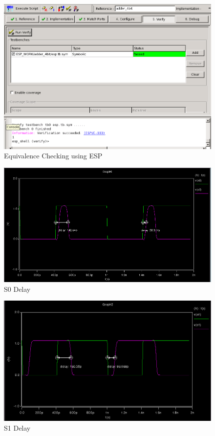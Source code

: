 \documentclass[12pt]{article}
\begin{document}
\begin{figure}[H]
\centering
\includegraphics[width=0.7\linewidth]{esp}
\caption{Equivalence Checking using ESP}
\label{fig:esp}
\end{figure}

\begin{figure}[H]
\centering
\includegraphics[width=\linewidth]{a0}
\caption{S0 Delay}
\label{fig:a0}
\end{figure}

\begin{figure}[H]
\centering
\includegraphics[width=\linewidth]{a1}
\caption{S1 Delay}
\label{fig:a1}
\end{figure}
\end{document}
